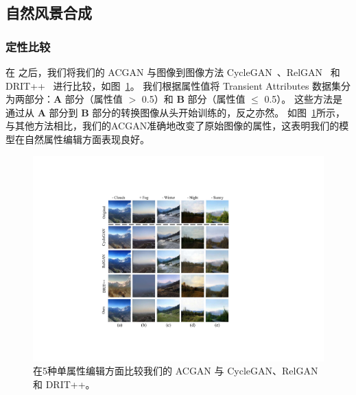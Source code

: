 \subsection{自然风景合成}

\subsubsection{定性比较}
在 \cite{iclr2021} 之后，我们将我们的 ACGAN 与图像到图像方法 CycleGAN~\cite{cyclegan}、RelGAN~\cite{relgan} 和 DRIT++~\cite{drit++} 进行比较，如图~\ref{fig:sceneComparison}。 我们根据属性值将 Transient Attributes 数据集分为两部分：\textbf{A} 部分（属性值 $>$ 0.5）和 \textbf{B} 部分（属性值 $\leq$ 0.5）。 这些方法是通过从 \textbf{A} 部分到 \textbf{B} 部分的转换图像从头开始训练的，反之亦然。
如图~\ref{fig:sceneComparison}所示，与其他方法相比，我们的ACGAN准确地改变了原始图像的属性，这表明我们的模型在自然属性编辑方面表现良好。

\begin{figure}[t]
    \begin{center}
         \includegraphics[width=0.7\linewidth]{figures/ACGAN/Scenecomparison.pdf}
    \end{center}
    \caption{在5种单属性编辑方面比较我们的 ACGAN 与 CycleGAN、RelGAN 和 DRIT++。}
    \label{fig:sceneComparison}
\end{figure}

